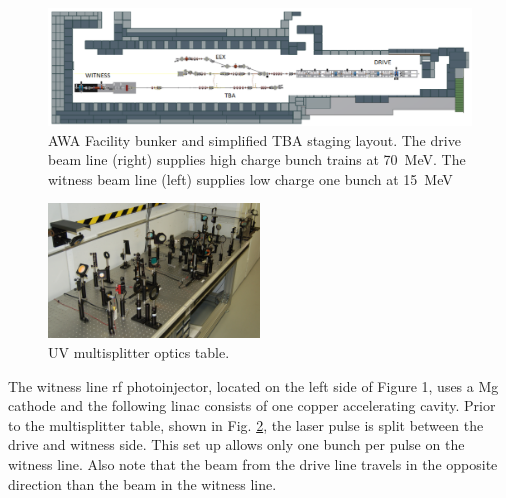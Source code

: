 \iftrue
\begin{figure}
	\begin{center}
		\includegraphics[width=\linewidth]{./images/bunker}
		
	\end{center}
	\caption{AWA Facility bunker and simplified TBA staging layout. 
		The drive beam line (right) supplies high charge bunch trains at \SI{70}{MeV}.
		The witness beam line (left) supplies low charge one bunch at \SI{15}{MeV} }
	\label{fig:bunker}
\end{figure}
\begin{figure}[h]
	\begin{center}
		\includegraphics[width=0.5\textwidth]{images/multisplitter}\caption{UV multisplitter optics table.}
	\end{center}
	\label{fig:optics}
\end{figure}
\fi

The witness line rf photoinjector, located on the left side of Figure
1, uses a Mg cathode and the following linac consists of one copper
accelerating cavity. Prior to the multisplitter table, shown in
Fig. \ref{fig:optics}, the laser pulse is split between the drive and witness side.
This set up allows only one bunch per pulse on the witness line. Also
note that the beam from the drive line travels in the opposite direction
than the beam in the witness line. 


 \label{sec:requirements}

